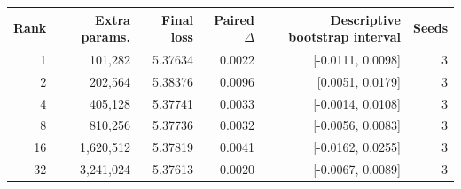 \begin{tabular}{rrrrrr}
\toprule
Rank & Extra params. & Final loss & Paired $\Delta$ & Descriptive bootstrap interval & Seeds \\
\midrule
1 & 101{,}282 & 5.37634 & 0.0022 & [-0.0111, 0.0098] & 3 \\
2 & 202{,}564 & 5.38376 & 0.0096 & [0.0051, 0.0179] & 3 \\
4 & 405{,}128 & 5.37741 & 0.0033 & [-0.0014, 0.0108] & 3 \\
8 & 810{,}256 & 5.37736 & 0.0032 & [-0.0056, 0.0083] & 3 \\
16 & 1{,}620{,}512 & 5.37819 & 0.0041 & [-0.0162, 0.0255] & 3 \\
32 & 3{,}241{,}024 & 5.37613 & 0.0020 & [-0.0067, 0.0089] & 3 \\
\bottomrule
\end{tabular}
